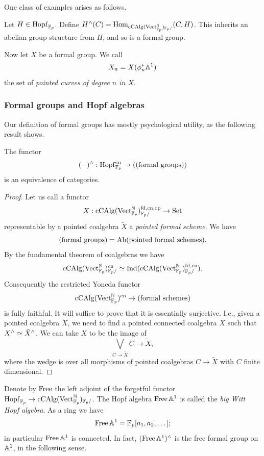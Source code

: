 One class of examples arises as follows.
\begin{example} \label{ex:fg-1}
Let $H \in \mathrm{Hopf}_{\mathbb{F}_p}$.
Define $H^\wedge(C) = \operatorname{Hom}_{\mathrm{cCAlg}(\mathrm{Vect}_{\mathbb{F}_p}^{\mathbb{N}})_{\mathbb{F}_p/}}(C, H)$.
This inherits an abelian group structure from $H$, and so is a formal group.
\end{example}

Now let $X$ be a formal group.
We call \[ X_n = X(\phi_n^* \mathbb A^1) \] the set of \emph{pointed curves of degree $n$ in $X$}.

\subsubsection{Formal groups and Hopf algebras}
Our definition of formal groups has mostly psychological utility, as the following result shows.
\begin{lemma} \label{lemm:HCAlg-vs-FG}
The functor \[ (\mathord-)^\wedge: \mathrm{Hopf}_{\mathbb{F}_p}^{\mathrm{cn}} \to (\text{(formal groups)}) \] is an equivalence of categories.
\end{lemma}
\begin{proof}
Let us call a functor
\[X: \mathrm{cCAlg}(\mathrm{Vect}_{\mathbb{F}_p}^{\mathbb{N}})^{\mathrm{fd},\mathrm{cn},\mathrm{op}}_{\mathbb{F}_p/} \to \mathrm{Set}\]
representable by a pointed coalgebra $\tilde X$ a \emph{pointed formal scheme}.
We have
\[(\text{formal groups}) = \mathrm{Ab}(\text{pointed formal schemes}).\]
By the fundamental theorem of coalgebras \cite[Corollary 2.2.2]{sweedler-hopf} we have
\[\mathrm{cCAlg}(\mathrm{Vect}_{\mathbb{F}_p}^{\mathbb{N}})^{\mathrm{cn}}_{\mathbb{F}_p/}
 \simeq \mathrm{Ind}(\mathrm{cCAlg}(\mathrm{Vect}_{\mathbb{F}_p}^{\mathbb{N}})^{\mathrm{fd},\mathrm{cn}}_{\mathbb{F}_p/}).\]
Consequently the restricted Yoneda functor
\[\mathrm{cCAlg}(\mathrm{Vect}_{\mathbb{F}_p}^{\mathbb{N}})^{\mathrm{cn}} \to (\text{formal schemes})\]
is fully faithful.
It will suffice to prove that it is essentially surjective.
I.e., given a pointed coalgebra $\tilde X$, we need to find a pointed connected coalgebra $X$ such that $X^\wedge \simeq \tilde X^\wedge$.
We can take $X$ to be the image of \[ \bigvee_{C \to \tilde X} C \to \tilde X, \] where the wedge is over all morphisms of pointed coalgebras $C \to \tilde X$ with $C$ finite dimensional.
\end{proof}

Denote by $\operatorname{Free}$ the left adjoint of the forgetful functor $\mathrm{Hopf}_{\mathbb{F}_p} \to \mathrm{cCAlg}(\mathrm{Vect}_{\mathbb{F}_p}^{\mathbb{N}})_{\mathbb{F}_p/}$.
The Hopf algebra $\operatorname{Free}\mathbb A^1$ is called the \emph{big Witt Hopf algebra}.
As a ring we have \[ \operatorname{Free}\mathbb A^1 = \mathbb{F}_p[a_1, a_2, \dots]; \] in particular $\operatorname{Free}\mathbb A^1$ is connected.
In fact, $(\operatorname{Free}\mathbb A^1)^\wedge$ is the free formal group on $\mathbb A^1$, in the following sense.

